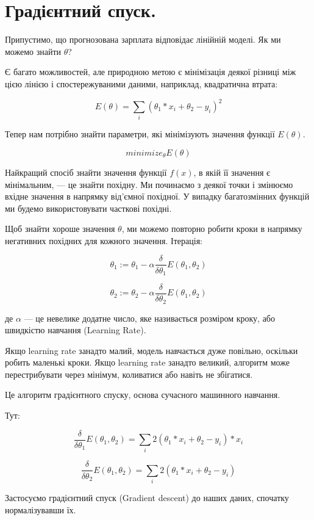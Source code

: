 \section{Градієнтний спуск.}

Припустимо, що прогнозована зарплата відповідає лінійній моделі. Як ми можемо знайти $\theta$? 

Є багато можливостей, але природною метою є мінімізація деякої різниці між цією лінією 
і спостережуваними даними, наприклад, квадратична втрата:

$$E(\theta) = \sum_{i}(\theta_{1}*x_{i} + \theta_{2} - y_{i} )^{2}$$

Тепер нам потрібно знайти параметри, які мінімізують значення функції $E(\theta)$.

$$minimize_{\theta}E(\theta)$$

Найкращий спосіб знайти значення функції $f(x)$, в якій її значення є мінімальним, — це знайти похідну. Ми починаємо з деякої точки і змінюємо вхідне значення в напрямку від'ємної похідної. У випадку багатозмінних функцій ми будемо використовувати часткові похідні.

Щоб знайти хороше значення $\theta$, ми можемо повторно робити кроки в напрямку 
негативних похідних для кожного значення. Ітерація:

$$ \theta_{1} := \theta_{1} - \alpha \frac{\delta}{\delta \theta_{1}} E(\theta_{1}, \theta_{2})$$

$$ \theta_{2} := \theta_{2} - \alpha \frac{\delta}{\delta \theta_{2}} E(\theta_{1}, \theta_{2})$$

де $\alpha$ — це невелике додатне число, яке називається розміром кроку, або швидкістю навчання (Learning Rate).

Якщо learning rate занадто малий, модель навчається дуже повільно, оскільки робить маленькі кроки. Якщо learning rate занадто великий, алгоритм може перестрибувати через мінімум, коливатися або навіть не збігатися.

Це алгоритм градієнтного спуску, основа сучасного машинного навчання.

Тут: 

$$\frac{\delta}{\delta \theta_{1}} E(\theta_{1}, \theta_{2}) = \sum_{i}2(\theta_{1}*x_{i} + \theta_{2} - y_{i} )*x_{i}$$

$$\frac{\delta}{\delta \theta_{2}} E(\theta_{1}, \theta_{2}) = \sum_{i}2(\theta_{1}*x_{i} + \theta_{2} - y_{i} )$$

Застосуємо градієнтний спуск (Gradient descent) до наших даних, спочатку нормалізувавши їх.

